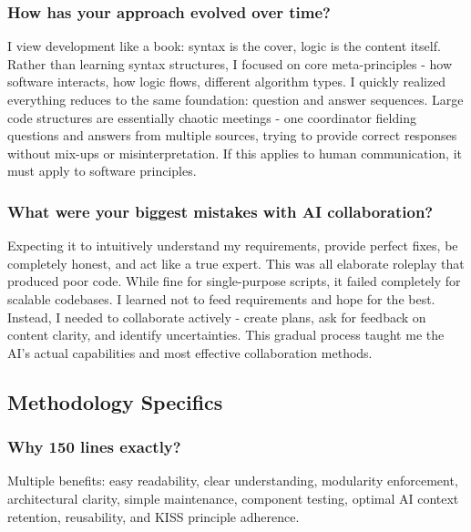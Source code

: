 \documentclass{article}
\begin{document}
\subsubsection{How has your approach evolved over time?}
I view development like a book: syntax is the cover, logic is the content itself. Rather than learning syntax structures, I focused on core meta-principles - how software interacts, how logic flows, different algorithm types. I quickly realized everything reduces to the same foundation: question and answer sequences. Large code structures are essentially chaotic meetings - one coordinator fielding questions and answers from multiple sources, trying to provide correct responses without mix-ups or misinterpretation. If this applies to human communication, it must apply to software principles.

\subsubsection{What were your biggest mistakes with AI collaboration?}
Expecting it to intuitively understand my requirements, provide perfect fixes, be completely honest, and act like a true expert. This was all elaborate roleplay that produced poor code. While fine for single-purpose scripts, it failed completely for scalable codebases. I learned not to feed requirements and hope for the best. Instead, I needed to collaborate actively - create plans, ask for feedback on content clarity, and identify uncertainties. This gradual process taught me the AI's actual capabilities and most effective collaboration methods.

\subsection{Methodology Specifics}

\subsubsection{Why 150 lines exactly?}
Multiple benefits: easy readability, clear understanding, modularity enforcement, architectural clarity, simple maintenance, component testing, optimal AI context retention, reusability, and KISS principle adherence.
\end{document}

